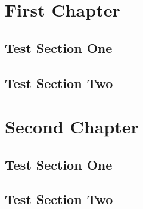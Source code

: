 \documentclass{book}
\begin{document}
\tableofcontents
\chapter{First Chapter}
\section{Test Section One}
\section{Test Section Two}
\chapter{Second Chapter}
\section{Test Section One}
\section{Test Section Two}
\end{document}
